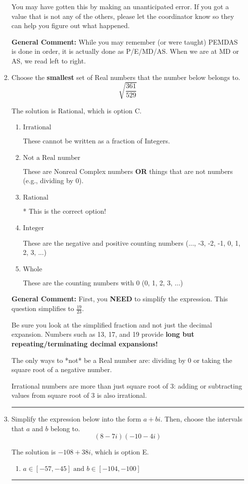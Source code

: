 \documentclass{extbook}[14pt]
\newcommand{\litem}[1]{\item #1

\rule{\textwidth}{0.4pt}}
\begin{document}
\begin{enumerate}
{\begin{enumerate}[label=\Alph*.]
 You may have gotten this by making an unanticipated error. If you got a value that is not any of the others, please let the coordinator know so they can help you figure out what happened.
\end{enumerate}

\textbf{General Comment:} While you may remember (or were taught) PEMDAS is done in order, it is actually done as P/E/MD/AS. When we are at MD or AS, we read left to right.
}
\litem{
Choose the \textbf{smallest} set of Real numbers that the number below belongs to.
\[ \sqrt{\frac{361}{529}} \]

The solution is \( \text{Rational} \), which is option C.\begin{enumerate}[label=\Alph*.]
\item \( \text{Irrational} \)

These cannot be written as a fraction of Integers.
\item \( \text{Not a Real number} \)

These are Nonreal Complex numbers \textbf{OR} things that are not numbers (e.g., dividing by 0).
\item \( \text{Rational} \)

* This is the correct option!
\item \( \text{Integer} \)

These are the negative and positive counting numbers (..., -3, -2, -1, 0, 1, 2, 3, ...)
\item \( \text{Whole} \)

These are the counting numbers with 0 (0, 1, 2, 3, ...)
\end{enumerate}

\textbf{General Comment:} First, you \textbf{NEED} to simplify the expression. This question simplifies to $\frac{19}{23}$. 
 
 Be sure you look at the simplified fraction and not just the decimal expansion. Numbers such as 13, 17, and 19 provide \textbf{long but repeating/terminating decimal expansions!} 
 
 The only ways to *not* be a Real number are: dividing by 0 or taking the square root of a negative number. 
 
 Irrational numbers are more than just square root of 3: adding or subtracting values from square root of 3 is also irrational.
}
\litem{
Simplify the expression below into the form $a+bi$. Then, choose the intervals that $a$ and $b$ belong to.
\[ (8 - 7 i)(-10 - 4 i) \]

The solution is \( -108 + 38 i \), which is option E.\begin{enumerate}[label=\Alph*.]
\item \( a \in [-57, -45] \text{ and } b \in [-104, -100] \)


\end{enumerate}}
\end{enumerate}
\end{document}
